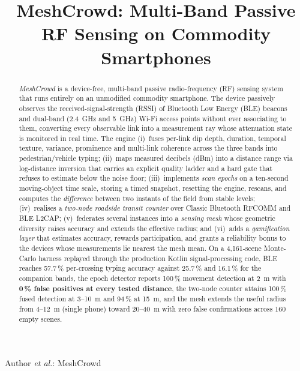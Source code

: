 \documentclass[journal,10pt]{IEEEtran}
\begin{document}
\title{MeshCrowd: Multi-Band Passive RF Sensing on Commodity Smartphones}

\author{%
}

%
{Author \MakeLowercase{\textit{et al.}}: MeshCrowd}

\maketitle

\begin{abstract}
\emph{MeshCrowd} is a device-free, multi-band passive radio-frequency (RF)
sensing system that runs entirely on an unmodified commodity smartphone. The
device passively observes the received-signal-strength (RSSI) of Bluetooth Low
Energy (BLE) beacons and dual-band (2.4~GHz and 5~GHz) Wi-Fi access points
without ever associating to them, converting every observable link into a
measurement ray whose attenuation state is monitored in real time. The engine
(i)~fuses per-link dip depth, duration, temporal texture, variance, prominence
and multi-link coherence across the three bands into pedestrian/vehicle typing;
(ii)~maps measured decibels (dBm) into a distance range via log-distance
inversion that carries an explicit quality ladder and a hard gate that refuses
to estimate below the noise floor; (iii)~implements \emph{scan epochs} on a
ten-second moving-object time scale, storing a timed snapshot, resetting the
engine, rescans, and computes the \emph{difference} between two instants of the
field from stable levels; (iv)~realises a \emph{two-node roadside transit
counter} over Classic Bluetooth RFCOMM and BLE L2CAP; (v)~federates several
instances into a \emph{sensing mesh} whose geometric diversity raises accuracy
and extends the effective radius; and (vi)~adds a \emph{gamification layer}
that estimates accuracy, rewards participation, and grants a reliability bonus
to the devices whose measurements lie nearest the mesh mean. On a 4,161-scene
Monte-Carlo harness replayed through the production Kotlin signal-processing
code, BLE reaches 57.7\,\% per-crossing typing accuracy against 25.7\,\% and
16.1\,\% for the companion bands, the epoch detector reports 100\,\% movement
detection at 2~m with \textbf{0\,\% false positives at every tested distance},
the two-node counter attains 100\,\% fused detection at 3--10~m and 94\,\% at
15~m, and the mesh extends the useful radius from 4--12~m (single phone)
toward 20--40~m with zero false confirmations across 160 empty scenes.
\end{abstract}
\end{document}
